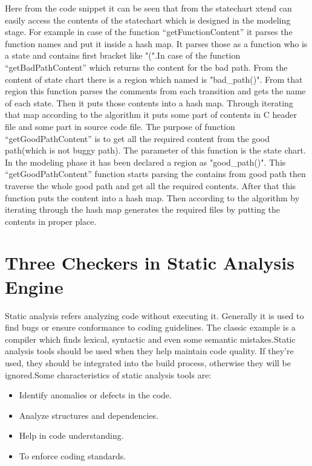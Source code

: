 Here from the code snippet it can be seen that from the statechart xtend can easily access the contents of the statechart which is designed in the modeling stage. For example in case of the function \enquote{getFunctionContent} it parses the function names and put it inside a hash map. It parses those as a function who is a state and contains first bracket like "(".In case of the function \enquote{getBadPathContent} which returns the content for the bad path. From the content of state chart there is a region which named is "bad\_path()". From that region this function parses the comments from each transition and gets the name of each state. Then it puts those contents into a hash map. Through iterating that map according to the algorithm it puts some part of contents in C header file and some part in source code file. The purpose of function \enquote{getGoodPathContent} is to get all the required content from the good path(which is not buggy path). The parameter of this function is the state chart. In the modeling phase it has been declared a region as "good\_path()". This \enquote{getGoodPathContent} function starts parsing the contains from good path then traverse the whole good path and get all the required contents. After that this function puts the content into a hash map. Then according to the algorithm by iterating through the hash map generates the required files by putting the contents in proper place. 



\section{Three Checkers in Static Analysis Engine}
Static analysis refers analyzing code without executing it. Generally it is used to find bugs or ensure conformance to coding guidelines. The classic example is a compiler which finds lexical, syntactic and even some semantic mistakes.Static analysis tools should be used when they help maintain code quality. If they're used, they should be integrated into the build process, otherwise they will be ignored.Some characteristics of static analysis tools are:
\begin{itemize}	
	\item Identify anomalies or defects in the code.
	\item Analyze structures and dependencies.
	\item Help in code understanding.
	\item To enforce coding standards.
\end{itemize}

